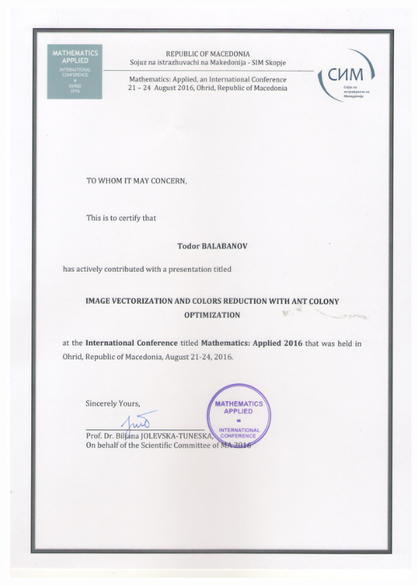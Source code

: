 \documentclass[bulgarian,a4paper]{europasscv}
\begin{document}
\includegraphics[width=\textwidth,height=\textheight,keepaspectratio]{MA2016}
\end{document}
